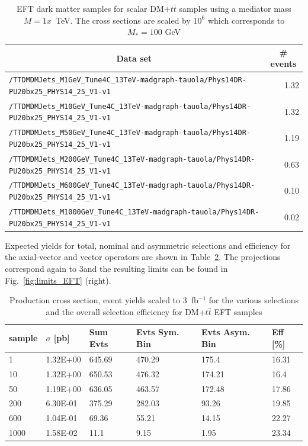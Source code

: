 \begin{table}[h!]
  \small
    \centering
    \caption{EFT dark matter samples for scalar DM+$t\bar{t}$ samples using a mediator mass $M=1x$~TeV. The cross sections are scaled by $10^6$ which corresponds to $M_*=100$ GeV \label{tab:datasets_dmtt}}
    \begin{tabular}{lr}
      \hline\hline
      \multicolumn{1}{c}{Data set}&\multicolumn{1}{c}{\# events}\tabularnewline
      \hline
      {\footnotesize \verb!/TTDMDMJets_M1GeV_Tune4C_13TeV-madgraph-tauola/Phys14DR- PU20bx25_PHYS14_25_V1-v1!}   & 1.32 \tabularnewline
      {\footnotesize \verb!/TTDMDMJets_M10GeV_Tune4C_13TeV-madgraph-tauola/Phys14DR- PU20bx25_PHYS14_25_V1-v1!}  & 1.32 \tabularnewline
      {\footnotesize \verb!/TTDMDMJets_M50GeV_Tune4C_13TeV-madgraph-tauola/Phys14DR- PU20bx25_PHYS14_25_V1-v1!}  & 1.19 \tabularnewline
      {\footnotesize \verb!/TTDMDMJets_M200GeV_Tune4C_13TeV-madgraph-tauola/Phys14DR- PU20bx25_PHYS14_25_V1-v1!} & 0.63 \tabularnewline
      {\footnotesize \verb!/TTDMDMJets_M600GeV_Tune4C_13TeV-madgraph-tauola/Phys14DR- PU20bx25_PHYS14_25_V1-v1!} & 0.10 \tabularnewline
      {\footnotesize \verb!/TTDMDMJets_M1000GeV_Tune4C_13TeV-madgraph-tauola/Phys14DR- PU20bx25_PHYS14_25_V1-v1!}& 0.02 \tabularnewline
      \hline \hline
\end{tabular}
\end{table}

Expected yields for total, nominal and asymmetric selections and efficiency for the axial-vector and vector operators are shown in Table~\ref{tab:dm_dmtt_EFT_g1}.
The projections correspond again to 3\fbinv and the resulting limits can be found in Fig.~\ref{fig:limits_EFT} (right).

\begin{table}[h!]
\centering
\begin{tabular}{llllll}
\hline
sample             & $\sigma$ [pb] & Sum Evts       & Evts Sym. Bin & Evts Asym. Bin & Eff  [\%]   \\\hline
1    & 1.32E+00 & 645.69 & 470.29 & 175.4  & 16.31 \\
10   & 1.32E+00 & 650.53 & 476.32 & 174.21 & 16.4  \\
50   & 1.19E+00 & 636.05 & 463.57 & 172.48 & 17.86 \\
200  & 6.30E-01 & 375.29 & 282.03 & 93.26  & 19.85 \\
600  & 1.04E-01 & 69.36  & 55.21  & 14.15  & 22.27\\
1000 & 1.58E-02 & 11.1   & 9.15   & 1.95   & 23.34 \\
\hline
\end{tabular}
\caption{Production cross section, event yields scaled to 3~fb$^{-1 }$ for the various selections and the overall selection efficiency for DM+$t\bar{t}$ EFT samples}
\label{tab:dm_dmtt_EFT_g1}
\end{table}



